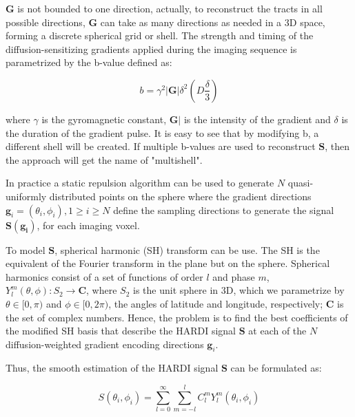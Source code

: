 \documentclass{cys}
\begin{document}
\bigskip
$\mathbf{G}$ is not bounded to one direction, actually, to reconstruct the tracts in all possible directions, $\mathbf{G}$ can take as many directions as needed in a 3D space, forming a discrete spherical grid or shell. The strength and timing of the diffusion-sensitizing gradients applied during the imaging sequence is parametrized by the b-value defined as:

\begin{equation}
b = \gamma^2 |\mathbf{G}|\delta^2\left( D \frac{\delta}{3} \right)
\end{equation}

where $\gamma$ is the gyromagnetic constant, $\mathbf{G}|$ is the intensity of the gradient and $\delta$ is the duration of the gradient pulse. It is easy to see that by modifying b, a different shell will be created. If multiple b-values are used to reconstruct $\mathbf{S}$, then the approach will get the name of "multishell".

\bigskip
In practice a static repulsion algorithm \cite{jones1999optimal} can be used to generate $N$ quasi-uniformly distributed points on the sphere where the gradient directions $\mathbf{g}_i=(\theta_i,\phi_i), 1\ge i \ge N $ define the sampling directions to generate the signal $\mathbf{S}(\mathbf{g_i})$, for each imaging voxel. %


\bigskip
To model $\mathbf{S}$, spherical harmonic (SH) transform can be use. The SH \cite{nikiforov1988special} is the equivalent of the Fourier transform in the plane but on the sphere. Spherical harmonics consist of a set of functions of order $l$ and phase $m$, $Y_l^m (\theta,\phi): S_2 \rightarrow \mathbf{C} $, where $S_2$ is the unit sphere in 3D, which we parametrize by $\theta \in [0,\pi)$ and $\phi \in [0, 2\pi)$, the angles of latitude and longitude, respectively; $\mathbf{C}$ is the set of complex numbers. Hence, the problem is to find the best coefficients of the modified SH basis that describe the HARDI signal $\mathbf{S}$ at each of the $N$ diffusion-weighted gradient encoding directions $\mathbf{g}_i$.

\bigskip
Thus, the smooth estimation of the HARDI signal $\mathbf{S}$ can be formulated as:

\begin{equation}
\label{SignalS}
S(\theta_i,\phi_i)=\sum_{l=0}^\infty \sum_{m=-l}^l C_l^m Y_l^m(\theta_i,\phi_i)
\end{equation}
\end{document}
